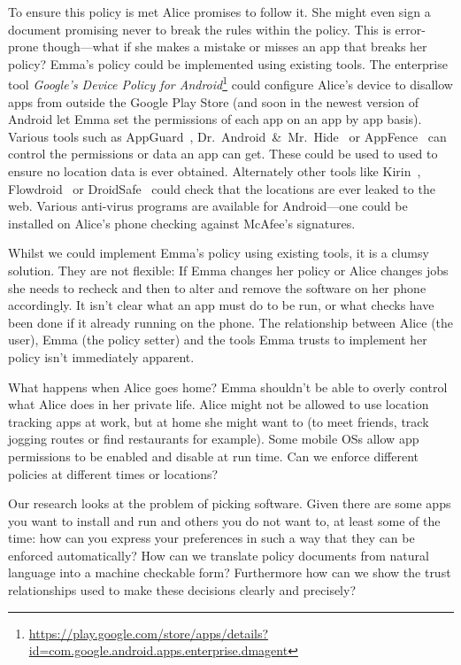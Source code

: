 \documentclass[]{scrartcl}
\begin{document}
To ensure this policy is met Alice promises to follow it.
She might even sign a document promising never to break the rules within the policy.
This is error-prone though---what if she makes a mistake or misses an app that breaks her policy?
Emma's policy could be implemented using existing tools.
The enterprise tool \emph{Google's Device Policy for Android}\footnote{\url{https://play.google.com/store/apps/details?id=com.google.android.apps.enterprise.dmagent}}
could configure Alice's device to disallow apps from outside the Google Play Store (and soon in the newest version of Android let Emma set the permissions of each app on an app by app basis).
Various tools such as AppGuard~\citep{Backes:2012vm}, Dr.~Android~\&~Mr.~Hide~\citep{Jeon:2012ki} or AppFence~\citep{Hornyack:2011wq} can control the permissions or data an app can get.
These could be used to used to ensure no location data is ever obtained.
Alternately other tools like Kirin~\citep{Enck:2009ko}, Flowdroid~\citep{Fritz:2013vi} or DroidSafe~\citep{Gordon:2015et} could check that the locations are ever leaked to the web.
Various anti-virus programs are available for Android---one could be installed on Alice's phone checking against McAfee's signatures.

Whilst we could implement Emma's policy using existing tools, it is a clumsy solution.
They are not flexible: If Emma changes her policy or Alice changes jobs she needs to recheck and then to alter and remove the software on her phone accordingly.
It isn't clear what an app must do to be run, or what checks have been done if it already running on the phone.
The relationship between Alice (the user), Emma (the policy setter) and the tools Emma trusts to implement her policy isn't immediately apparent.

What happens when Alice goes home?
Emma shouldn't be able to overly control what Alice does in her private life.
Alice might not be allowed to use location tracking apps at work, but at home she might want to (to meet friends, track jogging routes or find restaurants for example).
Some mobile OSs allow app permissions to be enabled and disable at run time.
Can we enforce different policies at different times or locations?

Our research looks at the problem of picking software.
Given there are some apps you want to install and run and others you do not want to, at least some of the time:
  how can you express your preferences in such a way that they can be enforced automatically?
How can we translate policy documents from natural language into a machine checkable form?
Furthermore how can we show the trust relationships used to make these decisions clearly and precisely?
\end{document}

